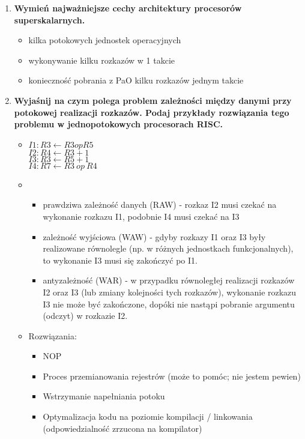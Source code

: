 \begin{enumerate}
			\item \textbf{Wymień najważniejsze cechy architektury procesorów superskalarnych.}
			\label{itm:superskalar}
			\begin{itemize}
				\item kilka potokowych jednostek operacyjnych
				\item wykonywanie kilku rozkazów w 1 takcie
				\item konieczność pobrania z PaO kilku rozkazów jednym takcie
			\end{itemize}
			
			
			\item \textbf{Wyjaśnij na czym polega problem zależności między danymi przy potokowej realizacji rozkazów. Podaj przykłady rozwiązania tego problemu w jednopotokowych procesorach RISC.}
			\begin{itemize}
				\item $ I1: R3 \leftarrow R3 op R5 $\\
					$ I2: R4 \leftarrow R3 + 1 $\\
					$ I3: R3 \leftarrow R5 + 1 $\\
					$ I4: R7 \leftarrow R3\:op\:R4 $
				\item 
				\begin{itemize}
					\item prawdziwa zależność danych (RAW) - rozkaz I2 musi czekać na wykonanie rozkazu I1, podobnie I4 musi czekać na I3
					\item zależność wyjściowa (WAW) - gdyby rozkazy I1 oraz I3 były realizowane równolegle (np. w różnych jednostkach funkcjonalnych), to wykonanie I3 musi się zakończyć po I1.
					\item antyzależność (WAR) - w przypadku równoległej realizacji rozkazów I2 oraz I3 (lub zmiany kolejności tych rozkazów), wykonanie rozkazu I3 nie może być zakończone, dopóki nie nastąpi pobranie argumentu (odczyt) w rozkazie I2.
				\end{itemize}
				\newpage
				\item Rozwiązania:
				\begin{itemize}
					\item NOP
					\item Proces przemianowania rejestrów (może to pomóc; nie jestem pewien)
					\item Wstrzymanie napełniania potoku
					\item Optymalizacja kodu na poziomie kompilacji / linkowania (odpowiedzialność zrzucona na kompilator)
				\end{itemize}

\end{itemize}
\end{enumerate}
